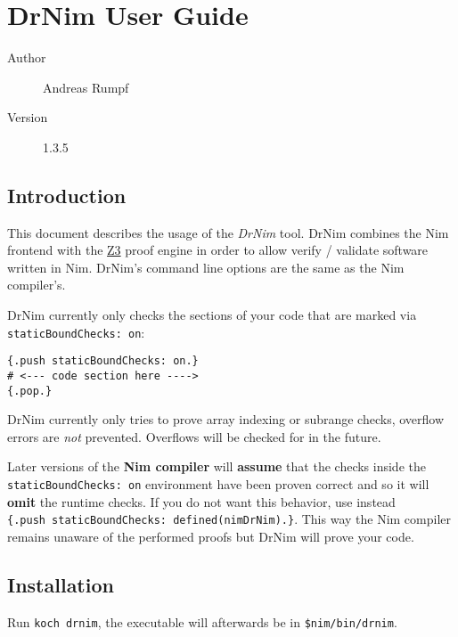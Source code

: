 \hypertarget{drnim-user-guide}{%
\section{DrNim User Guide}\label{drnim-user-guide}}

\begin{description}
\item[Author]
Andreas Rumpf
\item[Version]
1.3.5
\end{description}

\hypertarget{introduction}{%
\subsection{Introduction}\label{introduction}}

This document describes the usage of the \emph{DrNim} tool. DrNim
combines the Nim frontend with the
\href{https://github.com/Z3Prover/z3}{Z3} proof engine in order to allow
verify / validate software written in Nim. DrNim's command line options
are the same as the Nim compiler's.

DrNim currently only checks the sections of your code that are marked
via \texttt{staticBoundChecks:\ on}:

\begin{verbatim}
{.push staticBoundChecks: on.}
# <--- code section here ---->
{.pop.}
\end{verbatim}

DrNim currently only tries to prove array indexing or subrange checks,
overflow errors are \emph{not} prevented. Overflows will be checked for
in the future.

Later versions of the \textbf{Nim compiler} will \textbf{assume} that
the checks inside the \texttt{staticBoundChecks:\ on} environment have
been proven correct and so it will \textbf{omit} the runtime checks. If
you do not want this behavior, use instead
\texttt{\{.push\ staticBoundChecks:\ defined(nimDrNim).\}}. This way the
Nim compiler remains unaware of the performed proofs but DrNim will
prove your code.

\hypertarget{installation}{%
\subsection{Installation}\label{installation}}

Run \texttt{koch\ drnim}, the executable will afterwards be in
\texttt{\$nim/bin/drnim}.


